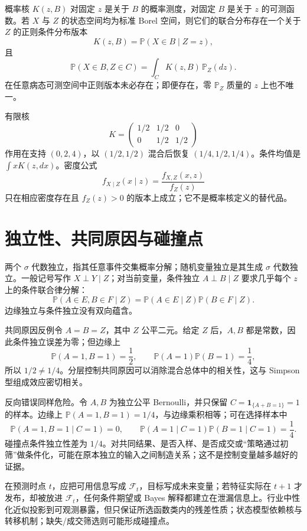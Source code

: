 概率核 $K(z,B)$ 对固定 $z$ 是关于 $B$ 的概率测度，对固定 $B$ 是关于 $z$ 的可测函数。若 $X$ 与 $Z$ 的状态空间均为标准 Borel 空间，则它们的联合分布存在一个关于 $Z$ 的正则条件分布版本
\[
  K(z,B)=\mathbb P(X\in B\mid Z=z),
\]
且
\[
 \mathbb P(X\in B,Z\in C)=\int_CK(z,B)\,\mathbb P_Z(dz).
\]
在任意病态可测空间中正则版本未必存在；即便存在，零 $\mathbb P_Z$ 质量的 $z$ 上也不唯一。

有限核
\[
 K=\begin{pmatrix}1/2&1/2&0\\0&1/2&1/2\end{pmatrix}
\]
作用在支持 $(0,2,4)$，以 $(1/2,1/2)$ 混合后恢复
$(1/4,1/2,1/4)$。条件均值是 $\int xK(z,dx)$。密度公式
\[
 f_{X\mid Z}(x\mid z)=\frac{f_{X,Z}(x,z)}{f_Z(z)}
\]
只在相应密度存在且 $f_Z(z)>0$ 的版本上成立；它不是概率核定义的替代品。

\section{独立性、共同原因与碰撞点}

两个 $\sigma$ 代数独立，指其任意事件交集概率分解；随机变量独立是其生成
$\sigma$ 代数独立。一般记号写作 $X\perp Y\mid Z$；对当前变量，条件独立
$A\perp B\mid Z$ 要求几乎每个 $z$ 上的条件联合律分解：
\[
 \mathbb P(A\in E,B\in F\mid Z)
 =\mathbb P(A\in E\mid Z)\mathbb P(B\in F\mid Z).
\]
边缘独立与条件独立没有双向蕴含。

共同原因反例令 $A=B=Z$，其中 $Z$ 公平二元。给定 $Z$ 后，$A,B$ 都是常数，因此条件独立误差为零；但边缘上
\[
 \mathbb P(A=1,B=1)=\frac12,
 \qquad \mathbb P(A=1)\mathbb P(B=1)=\frac14,
\]
所以 $1/2\ne1/4$。分层控制共同原因可以消除混合总体中的相关性，这与 Simpson 型组成效应密切相关。


反向错误同样危险。令 $A,B$ 为独立公平 Bernoulli，并只保留
$C=\mathbf1_{\{A+B=1\}}=1$ 的样本。边缘上
$\mathbb P(A=1,B=1)=1/4$，与边缘乘积相等；可在选择样本中
\[
 \mathbb P(A=1,B=1\mid C=1)=0,
 \qquad
 \mathbb P(A=1\mid C=1)\mathbb P(B=1\mid C=1)=\frac14.
\]
碰撞点条件独立性差为 $1/4$。对共同结果、是否入样、是否成交或“策略通过初筛”做条件化，可能在原本独立的输入之间制造关系；这不是控制变量越多越好的证据。


在预测时点 $t$，应把可用信息写成 $\mathcal F_t$，目标写成未来变量；若特征实际在 $t+1$ 才发布，却被放进 $\mathcal F_t$，任何条件期望或 Bayes 解释都建立在泄漏信息上。行业中性化近似投影到可观测暴露，但只保证所选函数类内的残差性质；状态模型依赖核与转移机制；缺失/成交筛选则可能形成碰撞点。

